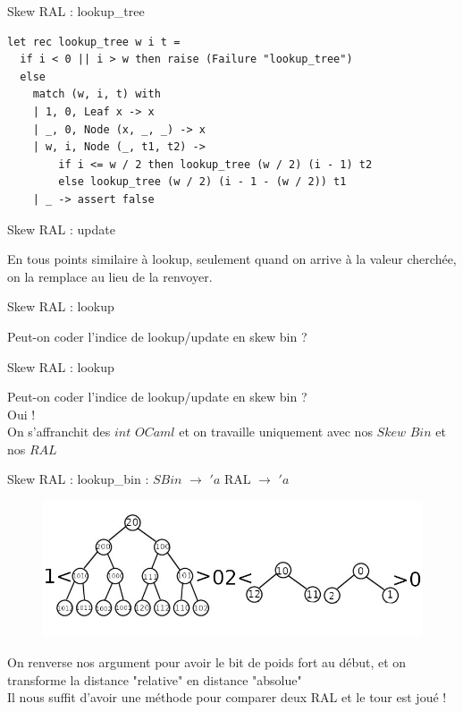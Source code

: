 \documentclass{beamer}
\begin{document}
\begin{frame}[fragile]{Skew RAL : lookup\_tree}
\begin{lstlisting}
let rec lookup_tree w i t =
  if i < 0 || i > w then raise (Failure "lookup_tree")
  else
    match (w, i, t) with
    | 1, 0, Leaf x -> x
    | _, 0, Node (x, _, _) -> x
    | w, i, Node (_, t1, t2) ->
        if i <= w / 2 then lookup_tree (w / 2) (i - 1) t2
        else lookup_tree (w / 2) (i - 1 - (w / 2)) t1
    | _ -> assert false
\end{lstlisting}
    
\end{frame}

\begin{frame}{Skew RAL : update}

En tous points similaire à lookup, seulement quand on arrive à la valeur cherchée, on la remplace au lieu de la renvoyer.
    
\end{frame}

\begin{frame}{Skew RAL : lookup}

Peut-on coder l'indice de lookup/update en skew bin ?
\phantom{Oui !}
    
\end{frame}

\begin{frame}{Skew RAL : lookup}

Peut-on coder l'indice de lookup/update en skew bin ?\\
Oui !\\
On s'affranchit des $int$ $OCaml$ et on travaille uniquement avec nos $Skew$ $Bin$ et nos $RAL$
    
\end{frame}

\begin{frame}{Skew RAL : lookup\_bin : $SBin$ $\rightarrow$ $'a$ RAL $\rightarrow$ $'a$}
\begin{figure}
    \centering
   \includegraphics[width=\textwidth]{exemple_ral_sbin.png}
\end{figure}
On renverse nos argument pour avoir le bit de poids fort au début, et on transforme la distance "relative" en distance "absolue"\\
Il nous suffit d'avoir une méthode pour comparer deux RAL et le tour est joué !
\end{frame}
\end{document}
